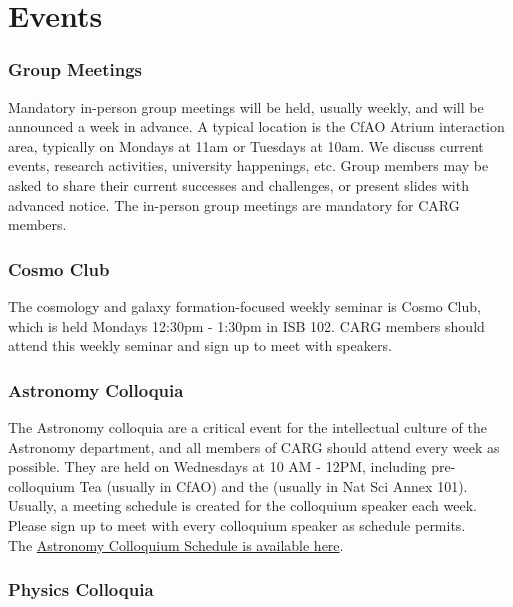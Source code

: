 \section{Events}
\label{sec:events}

\subsubsection{Group Meetings}
\label{sec:group_meetings}
Mandatory in-person group meetings will be held, usually
weekly, and will be announced a week in advance.
A typical location is the CfAO Atrium interaction
area, typically on Mondays at 11am or Tuesdays at 10am.
We discuss current events,
research activities, university
happenings, etc. Group members
may be asked to share their
current successes and challenges,
or present slides with advanced
notice.
The in-person group meetings are mandatory
for CARG members.

\subsubsection{Cosmo Club}
\label{sec:cosmo_club}

The cosmology and galaxy
formation-focused weekly
seminar is Cosmo Club, 
which is held
Mondays 12:30pm - 1:30pm in
ISB 102. CARG members should
attend this weekly seminar
and sign up 
to meet with speakers.

\subsubsection{Astronomy Colloquia}
\label{sec:astro_colloquia}

The Astronomy colloquia are a
critical event for the
intellectual culture of the
Astronomy department, and all
members of CARG should attend
every week as possible.
They are held on Wednesdays
at 10 AM - 12PM, including pre-colloquium Tea
(usually in CfAO) and the (usually in
Nat Sci Annex 101).\\

\noindent
Usually, a meeting schedule is 
created for the colloquium speaker each
week. Please sign up to meet
with every colloquium speaker as
schedule permits.\\

\noindent
The
\href{https://www.astro.ucsc.edu/news-events/Seminars/index.html}{Astronomy Colloquium Schedule is available here}.

\subsubsection{Physics Colloquia}
\label{sec:phys_colloquia}

